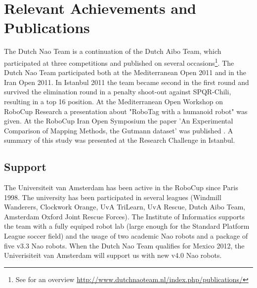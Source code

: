 \documentclass[11pt]{article}
\begin{document}
\section{Relevant Achievements and Publications}
The Dutch Nao Team is a continuation of the Dutch Aibo Team, which participated at three competitions and published on several occasions\footnote{See for an overview \url{http://www.dutchnaoteam.nl/index.php/publications/}}. 
The Dutch Nao Team participated both at the Mediterranean Open 2011 and in the Iran Open 2011.  In Istanbul 2011 the team became second in the first round and survived the elimination round in a penalty shoot-out against SPQR-Chili, resulting in a top 16 position. At the Mediterranean Open Workshop on RoboCup Research a presentation about "RoboTag with a humanoid robot" was given.
At the RoboCup Iran Open Symposium the paper 'An Experimental Comparison of Mapping Methods, the Gutmann dataset' was published \cite{Visser2011rios}. A summary of this study was presented at the Research Challenge in Istanbul.
\subsection*{Support}
The Universiteit van Amsterdam has been active in the RoboCup since Paris 1998. The university has been participated in several leagues (Windmill Wanderers, Clockwork Orange, UvA TriLearn, UvA Rescue, Dutch Aibo Team, Amsterdam Oxford Joint Rescue Forces).
The Institute of Informatics supports the team with a fully equiped robot lab (large enough for the Standard Platform League soccer field) and the usage of two academic Nao robots and a package of five v3.3 Nao robots.
When the Dutch Nao Team qualifies for Mexico 2012, the Univerisiteit van Amsterdam will support us with new v4.0 Nao robots.
\end{document}
